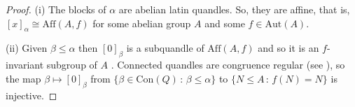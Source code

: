 \documentclass[a4paper, english, 9pt]{amsart}
\theoremstyle{plain}
\newtheorem{lemma}[theorem]{Lemma}
\theoremstyle{definition}
\def\aut#1{\mathrm{Aut}(#1)}
\def\aff#1{\mathrm{Aff}#1}
\def\dis{\mathrm{Dis}}
\def\con{\mathrm{Con}}
\def\comment#1{{\color{red} #1}}
\def\setof#1#2{\{#1\,\colon\,#2\}}
\def\Z{\mathbb Z}
\begin{document}
\begin{proof}
%
(i) The blocks of $\alpha$ are abelian latin quandles. So, they are affine, that is, $[x]_\alpha\cong \aff(A,f)$ for some abelian group $A$ and some $f\in \aut{A}$. 

(ii) Given $\beta\leq \alpha$ then $[0]_\beta$ is a subquandle of $\aff(A,f)$ and so it is an $f$-invariant subgroup of $A$ \cite[Proposition 3.14]{Principal}. Connected quandles are congruence regular (see \cite[Lemma 2.4]{Maltsev_paper}), so the map $\beta \mapsto [0]_\beta $ from $\setof{\beta\in \con(Q)}{\beta\leq \alpha}$ to $\setof{N\leq A}{f(N)=N}$ is injective.
\end{proof}



 


% 
\end{document}
